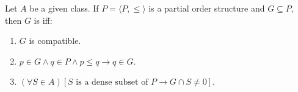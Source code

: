 Let $A$ be a given class. If $P = \langle P, \leq \rangle$ is a partial order structure and $G \subseteq P$, then $G$ is  iff:
\begin{enumerate}
\item $G$ is compatible.
\item $p \in G \land q \in P \land p \leq q \rightarrow q \in G$.
\item $(\forall S \in A)[S \text{ is a dense subset of } P \rightarrow G \cap S \neq 0]$.
\end{enumerate}
